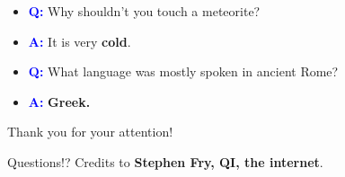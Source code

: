 \documentclass[14pt]{beamer}
\newcommand{\tc}[1]{\textcolor{blue}{\textbf{#1}}}
\begin{document}
\begin{frame}
\vfill
\begin{center}
    \large
\begin{itemize}[<+-| alert@+>]
    \item[] \tc{Q:} Why shouldn’t you touch a meteorite?
    \item[] \tc{A:} It is very \textbf{cold}.
\end{itemize}
\end{center}
\vfill
\end{frame}

\begin{frame}
\vfill
\begin{center}
    \large
\begin{itemize}[<+-| alert@+>]
    \item[] \tc{Q:} What language was mostly spoken in ancient Rome?
    \item[] \tc{A:} \textbf{Greek.}
\end{itemize}
\end{center}
\vfill
\end{frame}

\begin{frame}
\begin{center}
    {\Large Thank you for your attention!}

    \vfill
    {\huge Questions!?}
    \vfill
    \small Credits to \textbf{Stephen Fry, QI, the internet}.
\end{center}
\end{frame}
\end{document}
